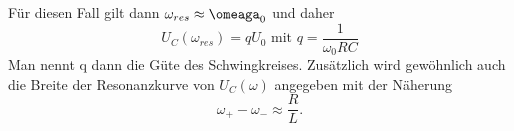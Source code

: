 \documentclass{scrartcl}
\begin{document}
     Für diesen Fall gilt dann $\omega_{res} \approx \omeaga_0$ und daher
     \begin{equation}
         \label{eqn:Güte}
         U_C(\omega_{res})= qU_0
         \text { mit }
          q=\frac{1}{\omega_0 RC}
     \end{equation}
     Man nennt q dann die Güte des Schwingkreises. Zusätzlich wird gewöhnlich auch die Breite der Resonanzkurve von $U_C(\omega)$ angegeben
     mit der Näherung
     \begin{equation}
         \label{eqn:Breite}
         \omega_+ -\omega_- \approx \frac{R}{L} .
     \end{equation}
\end{document}
